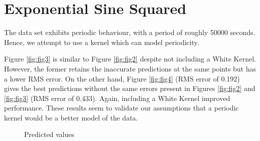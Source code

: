 \documentclass[11pt]{article}
\begin{document}
  \section{Exponential Sine Squared}
  \label{sec:ESS}
  The data set exhibits periodic behaviour, with a period of roughly 50000 seconds. Hence, we attempt to use a kernel which can model periodicity. 
  
  Figure \ref{fig:fig3} is similar to Figure \ref{fig:fig2} despite not including a White Kernel. However, the former retains the inaccurate predictions at the same points but has a lower RMS error. On the other hand, Figure \ref{fig:fig4} (RMS error of 0.192) gives the best predictions without the same errors present in Figures \ref{fig:fig2} and \ref{fig:fig3} (RMS error of 0.433). Again, including a White Kernel improved performance. These results seem to validate our assumptions that a periodic kernel would be a better model of the data.


  
  \begin{figure}[!htb]
      \centering
        \hfill
      \hfill
      \caption{Predicted values}
    \end{figure}
    
  
\end{document}
